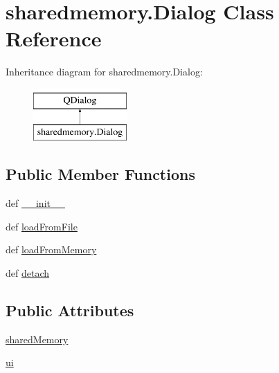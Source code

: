 \hypertarget{classsharedmemory_1_1Dialog}{}\section{sharedmemory.\+Dialog Class Reference}
\label{classsharedmemory_1_1Dialog}
Inheritance diagram for sharedmemory.\+Dialog\+:\begin{figure}[H]
\begin{center}
\leavevmode
\includegraphics[height=2.000000cm]{classsharedmemory_1_1Dialog}
\end{center}
\end{figure}
\subsection*{Public Member Functions}
\begin{DoxyCompactItemize}
\item 
def \hyperlink{classsharedmemory_1_1Dialog_ad7a5a004ab2014f44d6604e9bb48e886}{\+\_\+\+\_\+init\+\_\+\+\_\+}
\item 
def \hyperlink{classsharedmemory_1_1Dialog_af9ef8aaaf0bc2b15b6dff145ae8b0092}{load\+From\+File}
\item 
def \hyperlink{classsharedmemory_1_1Dialog_a7e434ce9b1b7c90194399a2764d5a9aa}{load\+From\+Memory}
\item 
def \hyperlink{classsharedmemory_1_1Dialog_a88d721f58f5112728d860eec261db2c9}{detach}
\end{DoxyCompactItemize}
\subsection*{Public Attributes}
\begin{DoxyCompactItemize}
\item 
\hyperlink{classsharedmemory_1_1Dialog_a7e6ad78e8d2a27ff905e4c7cfa09a909}{shared\+Memory}
\item 
\hyperlink{classsharedmemory_1_1Dialog_acd62e54f362063200fb201c52be27011}{ui}
\end{DoxyCompactItemize}


